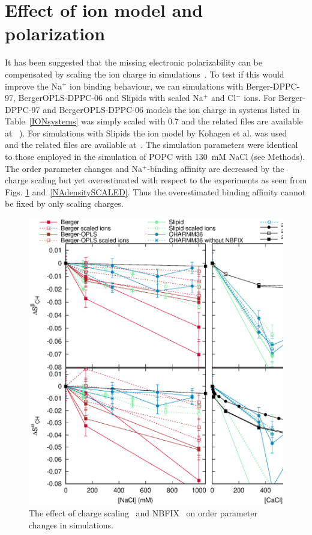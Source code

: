 \documentclass[pre,aps,floatfix,authordate1-4,twocolumn]{revtex4-1}
\begin{document}
\section{Effect of ion model and polarization}
It has been suggested that the missing electronic polarizability 
can be compensated by scaling the ion charge in simulations~\cite{leontyev11}. 
To test if this would improve the Na$^+$ ion binding behaviour, we ran simulations with Berger-DPPC-97, BergerOPLS-DPPC-06
and Slipids with scaled Na$^+$ and Cl$^-$ ions. For Berger-DPPC-97 and BergerOPLS-DPPC-06 models 
the ion charge in systems listed in Table~\ref{IONsystems} was simply scaled with 0.7 and
the related files are available 
at ~\cite{DPPCBergerNaCl150mMscaled,DPPCBergerNaCl1000mMscaled,DPPCBergerOPLS06NaCl150mMscaled,DPPCBergerOPLS06NaCl1000mMscaled}). 
For simulations with Slipids the ion model by Kohagen et al. was used~\cite{kohagen16} and the related files are 
available at~\cite{slipidsFILESpopcSCALED}. The simulation parameters were identical to those employed in the simulation of POPC with 130~mM NaCl (see Methods).
The order parameter changes and Na$^+$-binding affinity are decreased by the charge scaling but 
yet overestimated with respect to the experiments as seen from Figs. \ref{OPchangesSCALED} and~\ref{NAdensitySCALED}. 
Thus the overestimated binding affinity cannot be fixed by only scaling charges.

\begin{figure}[]
  \centering
  \includegraphics[width=16cm]{../Fig/OrderParameterIONSchangesSCALED.eps} 
  \caption{\label{OPchangesSCALED}
    The effect of charge scaling~\cite{leontyev11,kohagen14} and NBFIX~\cite{venable13} on order parameter changes in simulations. 
    }
\end{figure}
\end{document}
